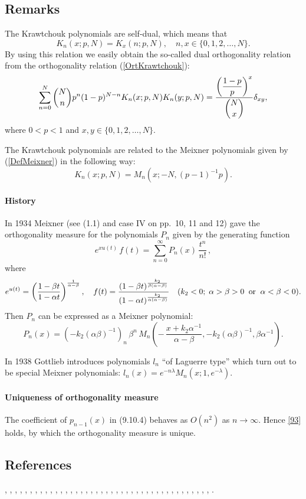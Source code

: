 \documentclass[envcountchap,graybox]{svmono}
\newcounter{rom}
\newcommand\al\alpha
\newcommand\be\beta
\newcommand\la\lambda
\newcommand\iy\infty
\begin{document}
\subsection*{Remarks}
The Krawtchouk polynomials are self-dual, which means that
$$K_n(x;p,N)=K_x(n;p,N),\quad n,x\in\{0,1,2,\ldots,N\}.$$
By using this relation we easily obtain the so-called dual orthogonality
relation from the orthogonality relation (\ref{OrtKrawtchouk}):
$$\sum_{n=0}^N\binom{N}{n}p^n(1-p)^{N-n} K_n(x;p,N)K_n(y;p,N)=
\frac{\displaystyle\left(\frac{1-p}{p}\right)^x}{\dbinom{N}{x}}\delta_{xy},$$
where $0 < p < 1$ and $x,y\in\{0,1,2,\ldots,N\}$.

\noindent
The Krawtchouk polynomials are related to the Meixner polynomials given by (\ref{DefMeixner})
in the following way:
$$K_n(x;p,N)=M_n(x;-N,(p-1)^{-1}p).$$
\label{sec9.10}
\paragraph{History}
In 1934 Meixner  (see
(1.1) and case IV on pp.~10, 11 and 12) gave the orthogonality
measure for the polynomials $P_n$ given by the generating function
\[
e^{x u(t)}\,f(t)=\sum_{n=0}^\iy P_n(x)\,\frac{t^n}{n!}\,,
\]
where
\[
e^{u(t)}=\left(\frac{1-\be t}{1-\al t}\right)^{\frac1{\al-\be}},\quad
f(t)=\frac{(1-\be t)^{\frac{k_2}{\be(\al-\be)}}}{(1-\al t)^{\frac{k_2}{\al(\al-\be)}}}\quad
(k_2<0;\;\al>\be>0\;\;{\rm or}\;\;\al<\be<0).
\]
Then $P_n$ can be expressed as a Meixner polynomial:
\[
P_n(x)=(-k_2(\al\be)^{-1})_n\,\be^n\,
M_n\left(-\,\frac{x+k_2\al^{-1}}{\al-\be},-k_2(\al\be)^{-1},\be\al^{-1}\right).
\]

In 1938 Gottlieb \cite[\S2]{K1} introduces polynomials $l_n$ ``of Laguerre type''
which turn out to be special Meixner polynomials:
$l_n(x)=e^{-n\la} M_n(x;1,e^{-\la})$.
%
\paragraph{Uniqueness of orthogonality measure}
The coefficient of $p_{n-1}(x)$ in (9.10.4) behaves as $O(n^2)$ as $n\to\iy$.
Hence \eqref{93} holds, by which the orthogonality measure is unique.
%

\subsection*{References}
\cite{AlSalam90}, \cite{AndrewsAskey85}, \cite{Area+II}, \cite{Askey75}, \cite{Askey89I},
\cite{AskeyGasper77}, \cite{AskeyWilson85}, \cite{AtakRahmanSuslov}, \cite{Campigotto+},
\cite{LChiharaStanton}, \cite{Chihara78}, \cite{Dette95}, \cite{Dominici}, \cite{Dunkl76},
\cite{Dunkl84}, \cite{DunklRamirez}, \cite{Erdelyi+}, \cite{FeinsilverSchott},
\cite{Gasper73I}, \cite{Gasper74}, \cite{HoareRahman}, \cite{Ismail2005II}, \cite{Karlin58},
\cite{Koorn82}, \cite{Koorn88}, \cite{LabelleYehI}, \cite{LabelleYehII}, \cite{Lesky62},
\cite{Lesky89}, \cite{Lesky94I}, \cite{Lesky95II}, \cite{LewanowiczII}, \cite{Nikiforov+},
\cite{NikiforovUvarov}, \cite{Qiu}, \cite{Rahman78I}, \cite{Rahman79}, \cite{Stanton84},
\cite{Stanton90}, \cite{Szego75}, \cite{Zarzo+}, \cite{Zeng90}.
\end{document}
